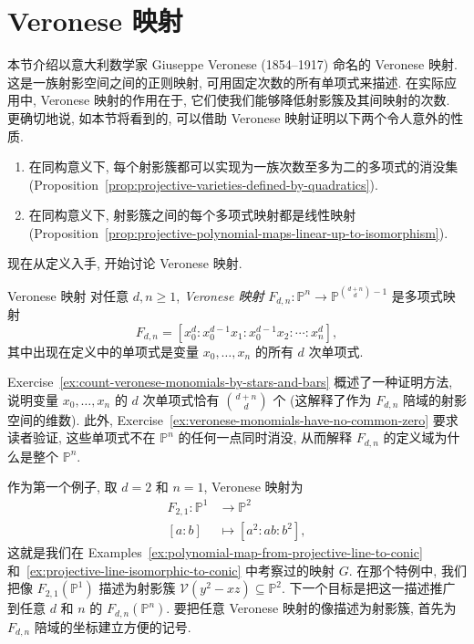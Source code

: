 \section{Veronese 映射}\label{sec:veronese-maps}

本节介绍以意大利数学家 Giuseppe Veronese (1854--1917) 命名的 Veronese 映射. 这是一族射影空间之间的正则映射, 可用固定次数的所有单项式来描述. 在实际应用中, Veronese 映射的作用在于, 它们使我们能够降低射影簇及其间映射的次数. 更确切地说, 如本节将看到的, 可以借助 Veronese 映射证明以下两个令人意外的性质.
\begin{enumerate}[label=\arabic*.]
  \item 在同构意义下, 每个射影簇都可以实现为一族次数至多为二的多项式的消没集 (Proposition~\ref{prop:projective-varieties-defined-by-quadratics}).
  \item 在同构意义下, 射影簇之间的每个多项式映射都是线性映射 (Proposition~\ref{prop:projective-polynomial-maps-linear-up-to-isomorphism}).
\end{enumerate}
现在从定义入手, 开始讨论 Veronese 映射.

\begin{Definition}{Veronese 映射}\leavevmode\label{def:veronese-map}
对任意 $d,n\ge1$, \emph{Veronese 映射} $F_{d,n}:\mathbb{P}^{n}\to\mathbb{P}^{\binom{d+n}{d}-1}$ 是多项式映射
\[
  F_{d,n}=[x_{0}^{d}:x_{0}^{d-1}x_{1}:x_{0}^{d-1}x_{2}:\cdots:x_{n}^{d}],
\]
其中出现在定义中的单项式是变量 $x_{0},\ldots,x_{n}$ 的所有 $d$ 次单项式.
\end{Definition}

Exercise~\ref{ex:count-veronese-monomials-by-stars-and-bars} 概述了一种证明方法, 说明变量 $x_{0},\ldots,x_{n}$ 的 $d$ 次单项式恰有 $\binom{d+n}{d}$ 个 (这解释了作为 $F_{d,n}$ 陪域的射影空间的维数). 此外, Exercise~\ref{ex:veronese-monomials-have-no-common-zero} 要求读者验证, 这些单项式不在 $\mathbb{P}^{n}$ 的任何一点同时消没, 从而解释 $F_{d,n}$ 的定义域为什么是整个 $\mathbb{P}^{n}$.

作为第一个例子, 取 $d=2$ 和 $n=1$, Veronese 映射为
\[
  \begin{aligned}
    F_{2,1}:\mathbb{P}^{1}&\to\mathbb{P}^{2}\\
    [a:b]&\mapsto[a^{2}:ab:b^{2}],
  \end{aligned}
\]
这就是我们在 Examples~\ref{ex:polynomial-map-from-projective-line-to-conic} 和~\ref{ex:projective-line-isomorphic-to-conic} 中考察过的映射 $G$. 在那个特例中, 我们把像 $F_{2,1}(\mathbb{P}^{1})$ 描述为射影簇 $\mathcal{V}(y^{2}-xz)\subseteq\mathbb{P}^{2}$. 下一个目标是把这一描述推广到任意 $d$ 和 $n$ 的 $F_{d,n}(\mathbb{P}^{n})$. 要把任意 Veronese 映射的像描述为射影簇, 首先为 $F_{d,n}$ 陪域的坐标建立方便的记号.

